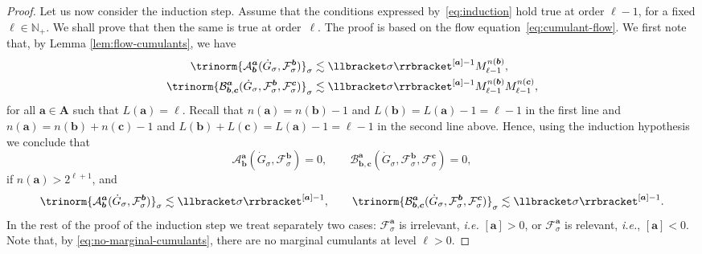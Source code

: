 \documentclass{article}
\numberwithin{equation}{section}
\theoremstyle{plain}
\theoremstyle{definition}
\begin{document}
\begin{proof}
  Let us now consider the induction step. Assume that the
  conditions expressed by~\eqref{eq:induction} hold true at order $\ell -
  1$, for a fixed $\ell \in \mathbb{N}_+$. We shall prove that then the same
  is true at order~$\ell$. The proof is based on the flow
  equation~\eqref{eq:cumulant-flow}. We first note that, by Lemma
  \ref{lem:flow-cumulants}, we have
  \[ \begin{aligned}
       \trinorm{ \mathcal{A}^{\boldsymbol{a}}_{\boldsymbol{b}}
       (\dot{G}_{\sigma}, \mathcal{F}^{\boldsymbol{b}}_{\sigma})
       }_{\sigma} & \lesssim  \llbracket \sigma
       \rrbracket^{[\boldsymbol{a}] - 1} M_{\ell - 1}^{n (\boldsymbol{b})},\\
       \trinorm{ \mathcal{B}^{\boldsymbol{a}}_{\boldsymbol{b}, \boldsymbol{c}}
       (\dot{G}_{\sigma}, \mathcal{F}^{\boldsymbol{b}}_{\sigma},
       \mathcal{F}^{\boldsymbol{c}}_{\sigma}) }_{\sigma} & \lesssim
       \llbracket \sigma \rrbracket^{[\boldsymbol{a}] - 1} M_{\ell - 1}^{n
       (\boldsymbol{b})} M_{\ell - 1}^{n (\boldsymbol{c})},
     \end{aligned} \]
  for all $\boldsymbol{a} \in \boldsymbol{A}$ such that $L (\boldsymbol{a}) = \ell$.
  Recall that $n (\boldsymbol{a}) = n (\boldsymbol{b}) - 1$ and $L (\boldsymbol{b})
  = L (\boldsymbol{a}) - 1 = \ell - 1$ in the first line and $n (\boldsymbol{a}) =
  n (\boldsymbol{b}) + n (\boldsymbol{c}) - 1$ and $L (\boldsymbol{b}) + L
  (\boldsymbol{c}) = L (\boldsymbol{a}) - 1 = \ell - 1$ in the second line above.
  Hence, using the induction hypothesis we conclude that
  \[ \mathcal{A}^{\boldsymbol{a}}_{\boldsymbol{b}} (\dot{G}_{\sigma},
     \mathcal{F}^{\boldsymbol{b}}_{\sigma}) = 0, \qquad
     \mathcal{B}^{\boldsymbol{a}}_{\boldsymbol{b}, \boldsymbol{c}}
     (\dot{G}_{\sigma}, \mathcal{F}^{\boldsymbol{b}}_{\sigma},
     \mathcal{F}^{\boldsymbol{c}}_{\sigma}) = 0, \]
  if $n (\boldsymbol{a}) > 2^{\ell + 1}$, and
  \begin{equation}
    \trinorm{ \mathcal{A}^{\boldsymbol{a}}_{\boldsymbol{b}} (\dot{G}_{\sigma},
    \mathcal{F}^{\boldsymbol{b}}_{\sigma}) }_{\sigma} \lesssim
    \llbracket \sigma \rrbracket^{[\boldsymbol{a}] - 1}, \qquad \trinorm{
    \mathcal{B}^{\boldsymbol{a}}_{\boldsymbol{b}, \boldsymbol{c}} (\dot{G}_{\sigma},
    \mathcal{F}^{\boldsymbol{b}}_{\sigma}, \mathcal{F}^{\boldsymbol{c}}_{\sigma})
    }_{\sigma} \lesssim \llbracket \sigma \rrbracket^{[\boldsymbol{a}]
    - 1} . \label{eq:bound-ind}
  \end{equation}
  In the rest of the proof of the induction step we treat separately two
  cases: $\mathcal{F}^{\boldsymbol{a}}_{\sigma}$ is irrelevant, \textit{i.e.}
  $[\boldsymbol{a}] > 0$, or $\mathcal{F}^{\boldsymbol{a}}_{\sigma}$ is relevant,
  {\textit{i.e.}}, $[\boldsymbol{a}] < 0$. Note that, by
  \eqref{eq:no-marginal-cumulants}, there are no marginal cumulants at level
  $\ell > 0$.
  

\end{proof}
\end{document}
